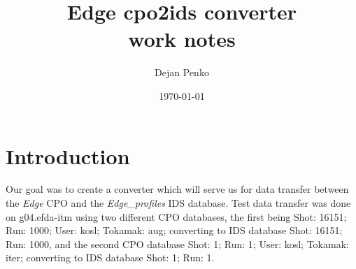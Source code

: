 \documentclass[a4paper,12pt,twoside]{article}
\begin{document}
\pagestyle{plain}
\addtolength{\baselineskip}{0.4ex} %

\renewcommand{\sectionmark}[1]{\markright{\thesection\ \ #1}}

\addtolength{\parskip}{\baselineskip}


\title{Edge cpo2ids converter\\work notes}
\author{Dejan Penko}
\date{\today}%

\thispagestyle{empty}
\makeatletter
{}
\makeatother
\newpage
\graphicspath{ {images/} }

\singlespacing
\tableofcontents
\clearpage
\listoffigures
\clearpage

\section{\textbf{Introduction}}
\label{sec:introduction}


Our goal was to create a converter which will serve us for data transfer between the \emph{Edge} CPO and the \emph{Edge\_profiles} IDS database. Test data transfer was done on g04.efda-itm using two different CPO databases, the first being Shot: 16151; Run: 1000; User: kosl; Tokamak: aug; converting to IDS database Shot: 16151; Run: 1000, and the second CPO database Shot: 1; Run: 1; User: kosl; Tokamak: iter; converting to IDS database Shot: 1; Run: 1.
\end{document}
